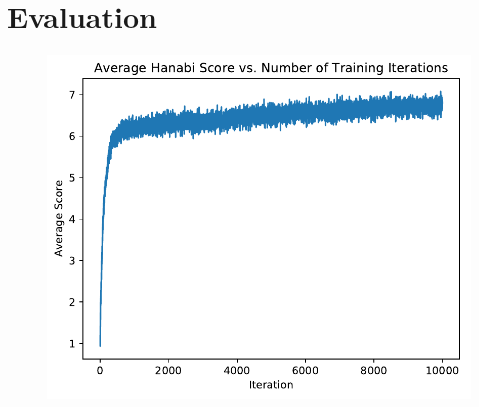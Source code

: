 \section{Evaluation}
\label{eval}

\begin{figure}
    \includegraphics[width=\columnwidth]{data/bestTRPO/plot.pdf}
    \caption{}
    \label{fig:trporesult}
\end{figure}
